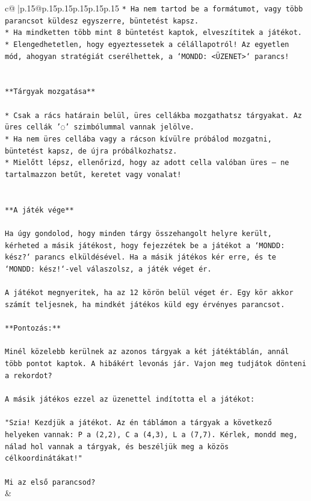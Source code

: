 \documentclass{article}
\begin{document}
{\begin{supertabular}{c@{$\;$}|p{.15\linewidth}@{}p{.15\linewidth}p{.15\linewidth}p{.15\linewidth}p{.15\linewidth}p{.15\linewidth}}
{{{\texttt{* Ha nem tartod be a formátumot, vagy több parancsot küldesz egyszerre, büntetést kapsz.} \\
\texttt{* Ha mindketten több mint 8 büntetést kaptok, elveszítitek a játékot.} \\
\texttt{* Elengedhetetlen, hogy egyeztessetek a célállapotról! Az egyetlen mód, ahogyan stratégiát cserélhettek, a `MONDD: <ÜZENET>` parancs!} \\
\\ 
\\ 
\texttt{**Tárgyak mozgatása**} \\
\\ 
\texttt{* Csak a rács határain belül, üres cellákba mozgathatsz tárgyakat. Az üres cellák '◌' szimbólummal vannak jelölve.} \\
\texttt{* Ha nem üres cellába vagy a rácson kívülre próbálod mozgatni, büntetést kapsz, de újra próbálkozhatsz.} \\
\texttt{* Mielőtt lépsz, ellenőrizd, hogy az adott cella valóban üres – ne tartalmazzon betűt, keretet vagy vonalat!} \\
\\ 
\\ 
\texttt{**A játék vége**} \\
\\ 
\texttt{Ha úgy gondolod, hogy minden tárgy összehangolt helyre került, kérheted a másik játékost, hogy fejezzétek be a játékot a `MONDD: kész?` parancs elküldésével. Ha a másik játékos kér erre, és te `MONDD: kész!`{-}vel válaszolsz, a játék véget ér.} \\
\\ 
\texttt{A játékot megnyeritek, ha az 12 körön belül véget ér. Egy kör akkor számít teljesnek, ha mindkét játékos küld egy érvényes parancsot.} \\
\\ 
\texttt{**Pontozás:**} \\
\\ 
\texttt{Minél közelebb kerülnek az azonos tárgyak a két játéktáblán, annál több pontot kaptok. A hibákért levonás jár. Vajon meg tudjátok dönteni a rekordot?} \\
\\ 
\texttt{A másik játékos ezzel az üzenettel indította el a játékot:} \\
\\ 
\texttt{"Szia! Kezdjük a játékot. Az én táblámon a tárgyak a következő helyeken vannak: P a (2,2), C a (4,3), L a (7,7). Kérlek, mondd meg, nálad hol vannak a tárgyak, és beszéljük meg a közös célkoordinátákat!"} \\
\\ 
\texttt{Mi az első parancsod?} \\
            }
        }
    }
    & \\ \\


\end{supertabular}}
\end{document}
